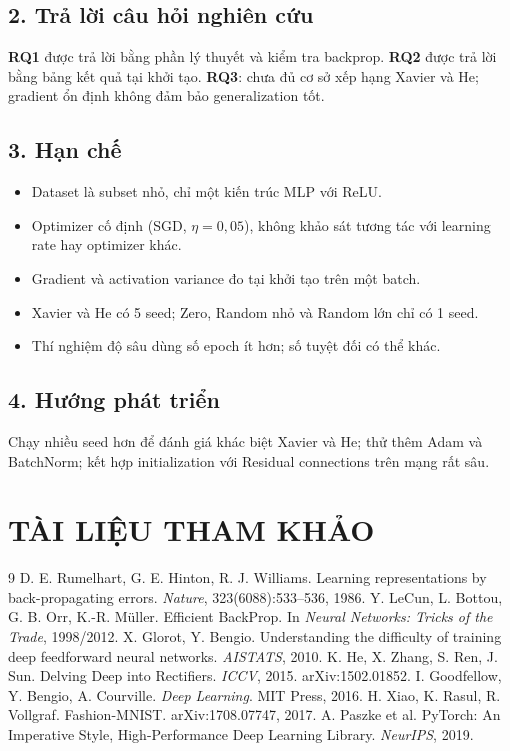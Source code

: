\documentclass[12pt,a4paper]{report}
\begin{document}
\section*{2. Trả lời câu hỏi nghiên cứu}
\textbf{RQ1} được trả lời bằng phần lý thuyết và kiểm tra backprop. \textbf{RQ2} được trả lời bằng bảng kết quả tại khởi tạo. \textbf{RQ3}: chưa đủ cơ sở xếp hạng Xavier và He; gradient ổn định không đảm bảo generalization tốt.

\section*{3. Hạn chế}
\begin{itemize}
  \item Dataset là subset nhỏ, chỉ một kiến trúc MLP với ReLU.
  \item Optimizer cố định (SGD, $\eta=0{,}05$), không khảo sát tương tác với learning rate hay optimizer khác.
  \item Gradient và activation variance đo tại khởi tạo trên một batch.
  \item Xavier và He có 5 seed; Zero, Random nhỏ và Random lớn chỉ có 1 seed.
  \item Thí nghiệm độ sâu dùng số epoch ít hơn; số tuyệt đối có thể khác.
\end{itemize}

\section*{4. Hướng phát triển}
Chạy nhiều seed hơn để đánh giá khác biệt Xavier và He; thử thêm Adam và BatchNorm; kết hợp initialization với Residual connections trên mạng rất sâu.

\chapter*{TÀI LIỆU THAM KHẢO}
\begin{thebibliography}{9}
 D. E. Rumelhart, G. E. Hinton, R. J. Williams. Learning representations by back-propagating errors. \emph{Nature}, 323(6088):533--536, 1986.
 Y. LeCun, L. Bottou, G. B. Orr, K.-R. Müller. Efficient BackProp. In \emph{Neural Networks: Tricks of the Trade}, 1998/2012.
 X. Glorot, Y. Bengio. Understanding the difficulty of training deep feedforward neural networks. \emph{AISTATS}, 2010.
 K. He, X. Zhang, S. Ren, J. Sun. Delving Deep into Rectifiers. \emph{ICCV}, 2015. arXiv:1502.01852.
 I. Goodfellow, Y. Bengio, A. Courville. \emph{Deep Learning}. MIT Press, 2016.
 H. Xiao, K. Rasul, R. Vollgraf. Fashion-MNIST. arXiv:1708.07747, 2017.
 A. Paszke et al. PyTorch: An Imperative Style, High-Performance Deep Learning Library. \emph{NeurIPS}, 2019.
\end{thebibliography}
\end{document}
